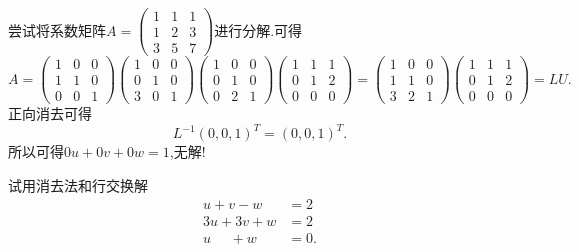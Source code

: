 ﻿\documentclass{book} \usepackage{exsheets} \usepackage{xeCJK}
\begin{document}
\begin{solution}
  尝试将系数矩阵$A=
  \begin{pmatrix}
    1&1&1\\
    1&2&3\\
    3&5&7
  \end{pmatrix}
  $进行分解.可得
$$
A=
\begin{pmatrix}
  1&0&0\\
  1&1&0\\
  0&0&1
\end{pmatrix}
\begin{pmatrix}
  1&0&0\\
  0&1&0\\
  3&0&1
\end{pmatrix}
\begin{pmatrix}
  1&0&0\\
  0&1&0\\
  0&2&1
\end{pmatrix}
\begin{pmatrix}
  1&1&1\\
  0&1&2\\
  0&0&0
\end{pmatrix}=
\begin{pmatrix}
  1&0&0\\
  1&1&0\\
  3&2&1
\end{pmatrix}
\begin{pmatrix}
  1&1&1\\
  0&1&2\\
  0&0&0
\end{pmatrix}=LU.
$$
正向消去可得
$$
L^{-1}(0,0,1)^{T}=(0,0,1)^T.
$$
所以可得$0u+0v+0w=1$,无解!
\end{solution}
\begin{question}
  试用消去法和行交换解
  \begin{align*}
    u+v-w&=2\\
    3u+3v+w&=2\\
    u~~~~~~+w&=0.
  \end{align*}
\end{question}
\end{document}
